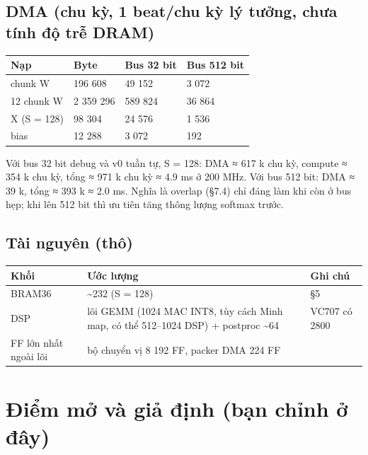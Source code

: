 \documentclass[11pt,a4paper]{article}
\renewcommand{\_}{\oldus\allowbreak}
\begin{document}
\subsection{DMA (chu kỳ, 1 beat/chu kỳ lý tưởng, chưa tính độ trễ DRAM)}

\begin{xltabular}{\linewidth}{@{}L{0.26}L{0.22}L{0.23}Y@{}}
\toprule
\textbf{Nạp} & \textbf{Byte} & \textbf{Bus 32 bit} & \textbf{Bus 512 bit} \\
\midrule
\endhead
\bottomrule
{} chunk W & 196 608 & 49 152 & 3 072 \\
12 chunk W & 2 359 296 & 589 824 & 36 864 \\
X (S = 128) & 98 304 & 24 576 & 1 536 \\
bias & 12 288 & 3 072 & 192 \\
\end{xltabular}

Với bus 32 bit debug và v0 tuần tự, S = 128: DMA ≈ 617 k chu kỳ, compute
≈ 354 k chu kỳ, tổng ≈ 971 k chu kỳ ≈ 4.9 ms ở 200 MHz. Với bus 512 bit:
DMA ≈ 39 k, tổng ≈ 393 k ≈ 2.0 ms. Nghĩa là overlap (§7.4) chỉ đáng làm
khi còn ở bus hẹp; khi lên 512 bit thì ưu tiên tăng thông lượng softmax
trước.

\subsection{Tài nguyên (thô)}

\begin{xltabular}{\linewidth}{@{}L{0.17}L{0.66}Y@{}}
\toprule
\textbf{Khối} & \textbf{Ước lượng} & \textbf{Ghi chú} \\
\midrule
\endhead
\bottomrule
\endlastfoot
BRAM36 & \textasciitilde232 (S = 128) & §5 \\
DSP & lõi GEMM (1024 MAC INT8, tùy cách Minh map, có thể 512--1024 DSP) + postproc \textasciitilde64 & VC707 có 2800 \\
FF lớn nhất ngoài lõi & bộ chuyển vị 8 192 FF, packer DMA 224 FF &  \\
\end{xltabular}

\section{Điểm mở và giả định (bạn chỉnh ở đây)}
\end{document}
